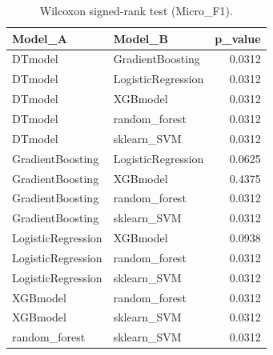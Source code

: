 \begin{table}[t]
\centering
\begin{tabular}{llr}
\toprule
Model_A & Model_B & p_value \\
\midrule
DTmodel & GradientBoosting & 0.0312 \\
DTmodel & LogisticRegression & 0.0312 \\
DTmodel & XGBmodel & 0.0312 \\
DTmodel & random_forest & 0.0312 \\
DTmodel & sklearn_SVM & 0.0312 \\
GradientBoosting & LogisticRegression & 0.0625 \\
GradientBoosting & XGBmodel & 0.4375 \\
GradientBoosting & random_forest & 0.0312 \\
GradientBoosting & sklearn_SVM & 0.0312 \\
LogisticRegression & XGBmodel & 0.0938 \\
LogisticRegression & random_forest & 0.0312 \\
LogisticRegression & sklearn_SVM & 0.0312 \\
XGBmodel & random_forest & 0.0312 \\
XGBmodel & sklearn_SVM & 0.0312 \\
random_forest & sklearn_SVM & 0.0312 \\
\bottomrule
\end{tabular}
\caption{Wilcoxon signed-rank test (Micro_F1).}
\label{tab:wilcoxon_Micro_F1}
\end{table}